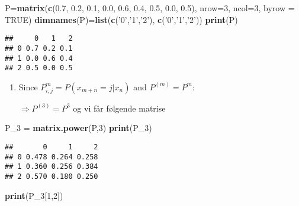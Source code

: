 \documentclass[]{article}
\newenvironment{Shaded}{\begin{snugshade}}{\end{snugshade}}
\newcommand{\DataTypeTok}[1]{\textcolor[rgb]{0.13,0.29,0.53}{#1}}
\newcommand{\DecValTok}[1]{\textcolor[rgb]{0.00,0.00,0.81}{#1}}
\newcommand{\FloatTok}[1]{\textcolor[rgb]{0.00,0.00,0.81}{#1}}
\newcommand{\KeywordTok}[1]{\textcolor[rgb]{0.13,0.29,0.53}{\textbf{#1}}}
\newcommand{\NormalTok}[1]{#1}
\newcommand{\OtherTok}[1]{\textcolor[rgb]{0.56,0.35,0.01}{#1}}
\newcommand{\StringTok}[1]{\textcolor[rgb]{0.31,0.60,0.02}{#1}}
\begin{document}
\begin{Shaded}
\begin{Highlighting}[]
\NormalTok{P=}\KeywordTok{matrix}\NormalTok{(}\KeywordTok{c}\NormalTok{(}\FloatTok{0.7}\NormalTok{, }\FloatTok{0.2}\NormalTok{, }\FloatTok{0.1}\NormalTok{, }\FloatTok{0.0}\NormalTok{, }\FloatTok{0.6}\NormalTok{, }\FloatTok{0.4}\NormalTok{, }\FloatTok{0.5}\NormalTok{, }\FloatTok{0.0}\NormalTok{, }\FloatTok{0.5}\NormalTok{), }\DataTypeTok{nrow=}\DecValTok{3}\NormalTok{, }\DataTypeTok{ncol=}\DecValTok{3}\NormalTok{, }\DataTypeTok{byrow =} \OtherTok{TRUE}\NormalTok{)}
\KeywordTok{dimnames}\NormalTok{(P)=}\KeywordTok{list}\NormalTok{(}\KeywordTok{c}\NormalTok{(}\StringTok{'0'}\NormalTok{,}\StringTok{'1'}\NormalTok{,}\StringTok{'2'}\NormalTok{), }\KeywordTok{c}\NormalTok{(}\StringTok{'0'}\NormalTok{,}\StringTok{'1'}\NormalTok{,}\StringTok{'2'}\NormalTok{))}
\KeywordTok{print}\NormalTok{(P)}
\end{Highlighting}
\end{Shaded}

\begin{verbatim}
##     0   1   2
## 0 0.7 0.2 0.1
## 1 0.0 0.6 0.4
## 2 0.5 0.0 0.5
\end{verbatim}

\begin{enumerate}
\def\labelenumi{\alph{enumi})}
\item
  Since \(P_{i,j}^{m} = P(x_{m+n}=j|x_{n})\) and \(P^{(m)}=P^{m}\):

  \(\Rightarrow{P^{(3)}=P^{3}}\) og vi får følgende matrise
\end{enumerate}

\begin{Shaded}
\begin{Highlighting}[]
\NormalTok{P_}\DecValTok{3}\NormalTok{ =}\StringTok{ }\KeywordTok{matrix.power}\NormalTok{(P,}\DecValTok{3}\NormalTok{)}
\KeywordTok{print}\NormalTok{(P_}\DecValTok{3}\NormalTok{)}
\end{Highlighting}
\end{Shaded}

\begin{verbatim}
##       0     1     2
## 0 0.478 0.264 0.258
## 1 0.360 0.256 0.384
## 2 0.570 0.180 0.250
\end{verbatim}

\begin{Shaded}
\begin{Highlighting}[]
\KeywordTok{print}\NormalTok{(P_}\DecValTok{3}\NormalTok{[}\DecValTok{1}\NormalTok{,}\DecValTok{2}\NormalTok{])}
\end{Highlighting}
\end{Shaded}
\end{document}
